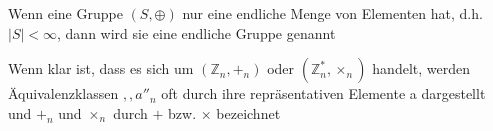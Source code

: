 \documentclass[a4paper]{article}
\begin{document}
\begin{multicols}{3}
\begin{itemize*}
\begin{itemize*}
                  \item Wenn eine Gruppe $( S , \oplus)$ nur eine endliche Menge von Elementen hat, d.h. $|S| < \infty$, dann wird sie eine endliche Gruppe genannt
            \end{itemize*}
            \item Wenn klar ist, dass es sich um $(\mathbb{Z}_n, +_n)$ oder $(\mathbb{Z}^*_n,\times_n)$ handelt, werden Äquivalenzklassen $,,a''_n$ oft durch ihre repräsentativen Elemente a dargestellt und $+_n$ und $\times_n$ durch $+$ bzw. $\times$ bezeichnet

\end{itemize*}
\end{multicols}
\end{document}
